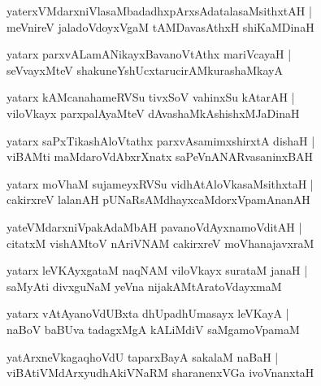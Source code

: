 \documentclass[twoside,12pt,openright]{book}
\newcounter{shloka}[chapter]
\begin{document}
\begin{shloka}%
yaterxVMdarxniVlasaMbadadhxpArxsAdatalasaMsithxtAH |\\
meVnireV jaladoVdoyxVgaM tAMDavasAthxH shiKaMDinaH 
\end{shloka}

\begin{shloka}%
yatarx parxvALamANikayxBavanoVtAthx mariVcayaH |\\
seVvayxMteV shakuneYshUcxtarucirAMkurashaMkayA 
\end{shloka}

\begin{shloka}%
yatarx kAMcanahameRVSu tivxSoV vahinxSu kAtarAH |\\
viloVkayx parxpalAyaMteV dAvashaMkAshishxMJaDinaH 
\end{shloka}

\begin{shloka}%
yatarx saPxTikashAloVtathx parxvAsamimxshirxtA dishaH |\\
viBAMti maMdaroVdAbxrXnatx saPeVnANARvasaninxBAH 
\end{shloka}

\begin{shloka}%
yatarx moVhaM sujameyxRVSu vidhAtAloVkasaMsithxtaH |\\
cakirxreV lalanAH pUNaRsAMdhayxcaMdorxVpamAnanAH 
\end{shloka}

\begin{shloka}%
yateVMdarxniVpakAdaMbAH pavanoVdAyxnamoVditAH |\\
citatxM vishAMtoV nAriVNAM cakirxreV moVhanajavxraM 
\end{shloka}

\begin{shloka}%
yatarx leVKAyxgataM naqNAM viloVkayx surataM janaH |\\
saMyAti divxguNaM yeVna nijakAMtAratoVdayxmaM
\end{shloka}

\begin{shloka}%
yatarx vAtAyanoVdUBxta dhUpadhUmasayx leVKayA |\\
naBoV baBUva tadagxMgA kALiMdiV saMgamoVpamaM 
\end{shloka}

\begin{shloka}%
yatArxneVkagaqhoVdU taparxBayA sakalaM naBaH |\\
viBAtiVMdArxyudhAkiVNaRM sharanenxVGa ivoVnanxtaH 
\end{shloka}
\end{document}
